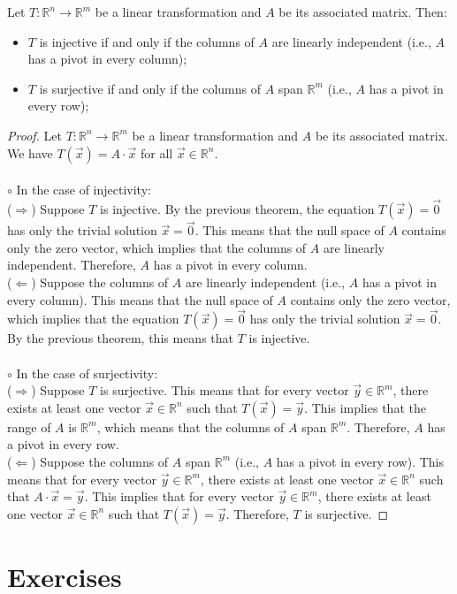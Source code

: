 \begin{theorem}
    Let $T: \mathbb{R}^n \to \mathbb{R}^m$ be a linear transformation and $A$ be its associated matrix. Then:
    \begin{itemize}[itemsep=1pt,label=$\circ$]
        \item $T$ is injective if and only if the columns of $A$ are linearly independent (i.e., $A$ has a pivot in every column);
        \item $T$ is surjective if and only if the columns of $A$ span $\mathbb{R}^m$ (i.e., $A$ has a pivot in every row);
    \end{itemize}
\end{theorem}
\begin{proof}
    Let $T: \mathbb{R}^n \to \mathbb{R}^m$ be a linear transformation and $A$ be its associated matrix. We have $T(\vec{x}) = A \cdot \vec{x}$ for all $\vec{x} \in \mathbb{R}^n$. \\ \\
    $\circ$ In the case of injectivity: \\
    ($\Rightarrow$) Suppose $T$ is injective. By the previous theorem, the equation $T(\vec{x}) = \vec{0}$ has only the trivial solution $\vec{x} = \vec{0}$. This means that the null space of $A$ contains only the zero vector, which implies that the columns of $A$ are linearly independent. Therefore, $A$ has a pivot in every column. \\
    ($\Leftarrow$) Suppose the columns of $A$ are linearly independent (i.e., $A$ has a pivot in every column). This means that the null space of $A$ contains only the zero vector, which implies that the equation $T(\vec{x}) = \vec{0}$ has only the trivial solution $\vec{x} = \vec{0}$. By the previous theorem, this means that $T$ is injective. \\ \\
    $\circ$ In the case of surjectivity: \\
    ($\Rightarrow$) Suppose $T$ is surjective. This means that for every vector $\vec{y} \in \mathbb{R}^m$, there exists at least one vector $\vec{x} \in \mathbb{R}^n$ such that $T(\vec{x}) = \vec{y}$. This implies that the range of $A$ is $\mathbb{R}^m$, which means that the columns of $A$ span $\mathbb{R}^m$. Therefore, $A$ has a pivot in every row. \\
    ($\Leftarrow$) Suppose the columns of $A$ span $\mathbb{R}^m$ (i.e., $A$ has a pivot in every row). This means that for every vector $\vec{y} \in \mathbb{R}^m$, there exists at least one vector $\vec{x} \in \mathbb{R}^n$ such that $A \cdot \vec{x} = \vec{y}$. This implies that for every vector $\vec{y} \in \mathbb{R}^m$, there exists at least one vector $\vec{x} \in \mathbb{R}^n$ such that $T(\vec{x}) = \vec{y}$. Therefore, $T$ is surjective.
\end{proof}
\section{Exercises}
